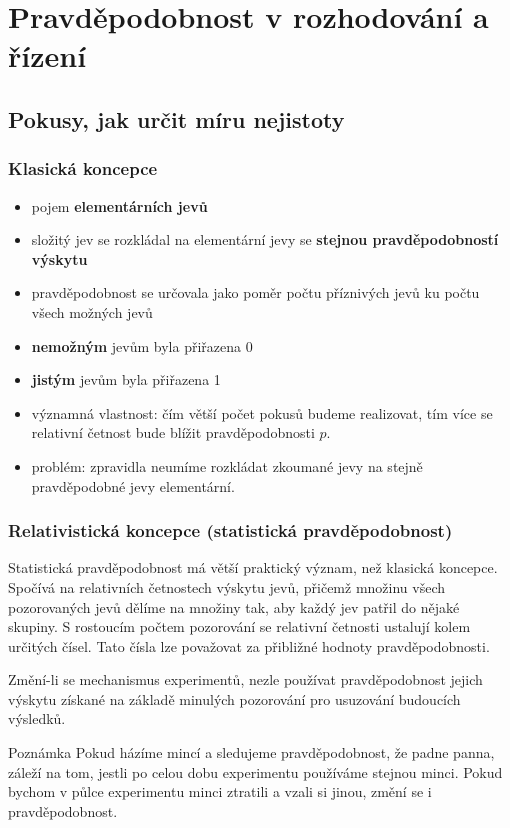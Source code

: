 \chapter{Pravděpodobnost v rozhodování a řízení}
\section{Pokusy, jak určit míru nejistoty}
\subsection{Klasická koncepce}
	\begin{itemize}
		\item pojem \textbf{elementárních jevů}
		\item složitý jev se rozkládal na elementární jevy se \textbf{stejnou pravděpodobností výskytu}
		\item pravděpodobnost se určovala jako poměr počtu příznivých jevů ku počtu všech možných jevů
		\item \textbf{nemožným} jevům byla přiřazena 0
		\item \textbf{jistým} jevům byla přiřazena 1
		\item významná vlastnost: čím větší počet pokusů budeme realizovat, tím více se relativní četnost bude blížit pravděpodobnosti $p$.
		\item problém: zpravidla neumíme rozkládat zkoumané jevy na stejně pravděpodobné jevy elementární.
	\end{itemize}

\subsection{Relativistická koncepce (statistická pravděpodobnost)}
Statistická pravděpodobnost má větší praktický význam, než klasická koncepce. Spočívá na relativních četnostech výskytu jevů, přičemž množinu všech pozorovaných jevů dělíme na množiny tak, aby každý jev patřil do nějaké skupiny. S rostoucím počtem pozorování se relativní četnosti ustalují kolem určitých čísel. Tato čísla lze považovat za přibližné hodnoty pravděpodobnosti.\br

	Změní-li se mechanismus experimentů, nezle používat pravděpodobnost jejich výskytu získané na základě minulých pozorování pro usuzování budoucích výsledků.

	\begin{note}{Poznámka}
	Pokud házíme mincí a sledujeme pravděpodobnost, že padne panna, záleží na tom, jestli po celou dobu experimentu používáme stejnou minci. Pokud bychom v půlce experimentu minci ztratili a vzali si jinou, změní se i pravděpodobnost.
	\end{note}

